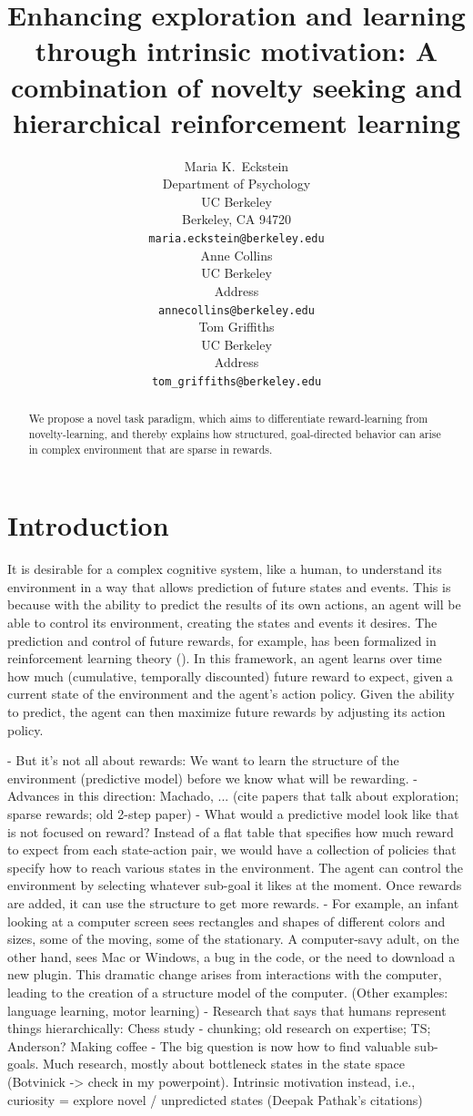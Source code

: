\documentclass{article}
\title{Enhancing exploration and learning through intrinsic motivation: A combination of novelty seeking and hierarchical reinforcement learning}
\author{
  Maria K.~Eckstein \\
  Department of Psychology \\
  UC Berkeley \\
  Berkeley, CA 94720 \\
  \texttt{maria.eckstein@berkeley.edu} \\  
  \And
  Anne Collins \\
  UC Berkeley \\
  Address \\
  \texttt{annecollins@berkeley.edu} \\
  \And
  Tom Griffiths \\
  UC Berkeley \\
  Address \\
  \texttt{tom_griffiths@berkeley.edu} \\
}
\begin{document}
\maketitle

\begin{abstract}
  We propose a novel task paradigm, which aims to differentiate reward-learning from novelty-learning, and thereby explains how structured, goal-directed behavior can arise in complex environment that are sparse in rewards. 
\end{abstract}

\section{Introduction}

It is desirable for a complex cognitive system, like a human, to understand its environment in a way that allows prediction of future states and events. This is because with the ability to predict the results of its own actions, an agent will be able to control its environment, creating the states and events it desires. The prediction and control of future rewards, for example, has been formalized in reinforcement learning theory (\cite{sutton_reinforcement_2017}). In this framework, an agent learns over time how much (cumulative, temporally discounted) future reward to expect, given a current state of the environment and the agent's action policy. Given the ability to predict, the agent can then maximize future rewards by adjusting its action policy.

- But it's not all about rewards: We want to learn the structure of the environment (predictive model) before we know what will be rewarding.
- Advances in this direction: Machado, ... (cite papers that talk about exploration; sparse rewards; old 2-step paper)
- What would a predictive model look like that is not focused on reward? Instead of a flat table that specifies how much reward to expect from each state-action pair, we would have a collection of policies that specify how to reach various states in the environment. The agent can control the environment by selecting whatever sub-goal it likes at the moment. Once rewards are added, it can use the structure to get more rewards. 
- For example, an infant looking at a computer screen sees rectangles and shapes of different colors and sizes, some of the moving, some of the stationary. A computer-savy adult, on the other hand, sees Mac or Windows, a bug in the code, or the need to download a new plugin. This dramatic change arises from interactions with the computer, leading to the creation of a structure model of the computer. (Other examples: language learning, motor learning)
- Research that says that humans represent things hierarchically: Chess study - chunking; old research on expertise; TS; Anderson? Making coffee
- The big question is now how to find valuable sub-goals. Much research, mostly about bottleneck states in the state space (Botvinick -> check in my powerpoint). Intrinsic motivation instead, i.e., curiosity = explore novel / unpredicted states (Deepak Pathak's citations)
\end{document}
